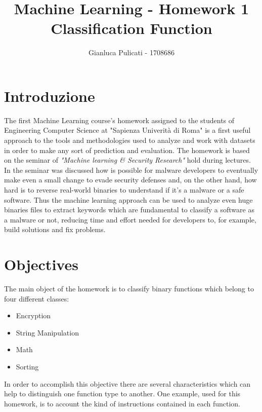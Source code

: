 \documentclass[11pt]{scrartcl}
\title{Machine Learning - Homework 1 \\
		\vspace{+0.5cm}
		\LARGE{Classification Function}}
\author{Gianluca Pulicati - 1708686}
\date{\vspace{-5ex}}
\begin{document}
\maketitle

\vspace{+0.01cm}
\section*{Introduzione}
\noindent
\large{The first Machine Learning course's homework assigned to the students of Engineering Computer Science at "Sapienza Univerità di Roma" is a first useful approach to the tools and methodologies used to analyze and work with datasets in order to make any sort of prediction and evaluation. \newline
The homework is based on the seminar of \textit{"Machine learning \& Security Research"} hold during lectures. In the seminar was discussed how is possible for malware developers to eventually make even a small change to evade security defenses and, on the other hand, how hard is to reverse real-world binaries to understand if it's a malware or a safe software. Thus the machine learning approach can be used to analyze even huge binaries files to extract keywords which are fundamental to classify a software as a malware or not, reducing time and effort needed for developers to, for example, build solutions and fix problems.
}

\vspace{1.0cm}

\section* {Objectives}
\noindent
\large{The main object of the homework is to classify binary functions which belong to four different classes:}

\begin{itemize}
	\item Encryption
	\item String Manipulation
	\item Math
	\item Sorting
\end{itemize}

\noindent
\large{In order to accomplish this objective there are several characteristics which can help to distinguish one function type to another. One example, used for this homework, is to account the kind of instructions contained in each function.}
\end{document}
